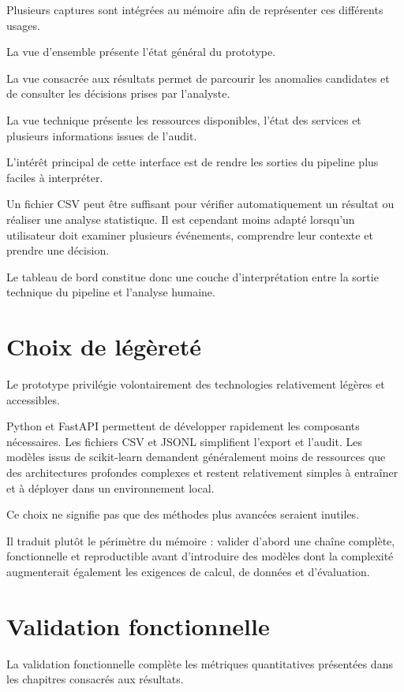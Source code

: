 Plusieurs captures sont intégrées au mémoire afin de représenter ces différents usages.

La vue d'ensemble présente l'état général du prototype.

La vue consacrée aux résultats permet de parcourir les anomalies candidates et de consulter les décisions prises par l'analyste.

La vue technique présente les ressources disponibles, l'état des services et plusieurs informations issues de l'audit.

L'intérêt principal de cette interface est de rendre les sorties du pipeline plus faciles à interpréter.

Un fichier CSV peut être suffisant pour vérifier automatiquement un résultat ou réaliser une analyse statistique. Il est cependant moins adapté lorsqu'un utilisateur doit examiner plusieurs événements, comprendre leur contexte et prendre une décision.

Le tableau de bord constitue donc une couche d'interprétation entre la sortie technique du pipeline et l'analyse humaine.

\section{Choix de légèreté}

Le prototype privilégie volontairement des technologies relativement légères et accessibles.

Python et FastAPI permettent de développer rapidement les composants nécessaires. Les fichiers CSV et JSONL simplifient l'export et l'audit. Les modèles issus de scikit-learn demandent généralement moins de ressources que des architectures profondes complexes et restent relativement simples à entraîner et à déployer dans un environnement local.

Ce choix ne signifie pas que des méthodes plus avancées seraient inutiles.

Il traduit plutôt le périmètre du mémoire : valider d'abord une chaîne complète, fonctionnelle et reproductible avant d'introduire des modèles dont la complexité augmenterait également les exigences de calcul, de données et d'évaluation.

\section{Validation fonctionnelle}

La validation fonctionnelle complète les métriques quantitatives présentées dans les chapitres consacrés aux résultats.

